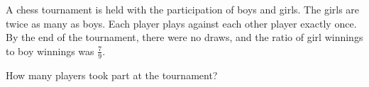 \documentclass[varwidth]{standalone}
\begin{document}
    A chess tournament is held with the participation of boys and girls. The girls are twice as many as boys. Each player plays against each other player exactly once. By the end of the tournament, there were no draws, and the ratio of girl winnings to boy winnings was $\frac{7}{9}$.

    How many players took part at the tournament?
\end{document}
